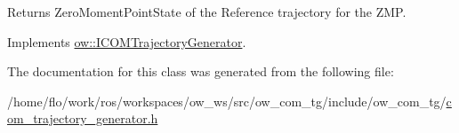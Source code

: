 \begin{DoxyReturn}{Returns}
Zero\+Moment\+Point\+State of the Reference trajectory for the Z\+MP. 
\end{DoxyReturn}


Implements \hyperlink{classow_1_1ICOMTrajectoryGenerator_a45f42b461f2377055071338ef719aa50}{ow\+::\+I\+C\+O\+M\+Trajectory\+Generator}.



The documentation for this class was generated from the following file\+:\begin{DoxyCompactItemize}
\item 
/home/flo/work/ros/workspaces/ow\+\_\+ws/src/ow\+\_\+com\+\_\+tg/include/ow\+\_\+com\+\_\+tg/\hyperlink{com__trajectory__generator_8h}{com\+\_\+trajectory\+\_\+generator.\+h}\end{DoxyCompactItemize}
